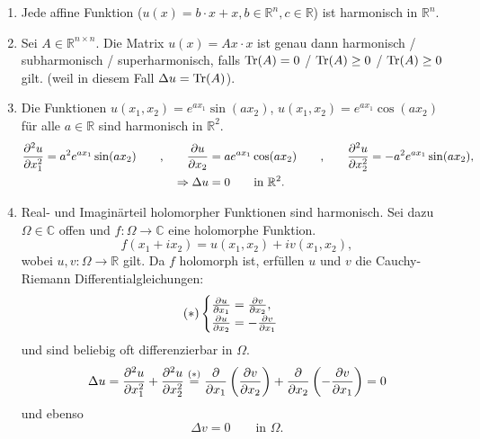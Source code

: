 \begin{beispiele}
	\begin{enumerate}[1.]
		\item Jede affine Funktion ($u(x) = b \cdot x + x, b \in \mathbb{R}^n , c \in \mathbb{R}$) ist harmonisch in $\mathbb{R}^n$.
		\item Sei $A \in \mathbb{R}^{n \times n}$. Die Matrix $u(x) = Ax \cdot x$ ist genau dann harmonisch / subharmonisch / superharmonisch, falls $ \operatorname{Tr}(A)= 0$ / $ \operatorname{Tr}(A) \geq  0 $ / $ \operatorname{Tr}(A) \geq  0 $ gilt. (weil in diesem Fall $\Delta u = \operatorname{Tr}(A)$).
		\item Die Funktionen $u(x_1,x_2)= e^{ax_1}\sin(ax_2)$, $u(x_1,x_2)= e^{ax_1} \cos(ax_2)$ für alle $a \in \mathbb{R}$ sind harmonisch in $\mathbb{R}^2$.
		\begin{align}
			\frac{{\partial ^2u}}{{\partial x_1^2}}  = a^2 e^{ax_1} \sin(ax_2) \qquad \text{,} \qquad \frac{{\partial u}}{{\partial x_2}}  &= a e^{ax_1} \cos(ax_2) 
			\qquad \text{,} \qquad \frac{{\partial ^2u}}{{\partial x_2^2}}  = - a^2 e^{ax_1} \sin(ax_2), \\
			\Rightarrow \Delta u &= 0 \qquad \text{in } \mathbb{R}^2.
		\end{align}
		\item Real- und Imaginärteil holomorpher Funktionen sind harmonisch. Sei dazu $\Omega \in \mathbb{C}$ offen und $f: \Omega \to \mathbb{C}$ eine holomorphe Funktion.
		\begin{equation}
			f ( x_1 + i x_2) = u(x_1,x_2) + i v(x_1,x_2), 
		\end{equation}
		wobei $u,v : \Omega \to  \mathbb{R}$ gilt. Da $f$ holomorph ist, erfüllen $u$ und $v$ die Cauchy-Riemann Differentialgleichungen:
		\begin{align}
			(*)
			\begin{cases}
				\frac{{\partial u}}{{\partial x_1}} = \frac{{\partial v}}{{\partial x_2}} , \\
				\frac{{\partial u}}{{\partial x_2}} = -\frac{{\partial v}}{{\partial x_1}} 	\label{(stern)}
			\end{cases}
		\end{align}
		und sind beliebig oft differenzierbar in $\Omega$.
		\begin{equation}
			\Delta u = \frac{{\partial ^2u}}{{\partial x_1^2}}  + \frac{{\partial ^2u}}{{\partial x_2^2}}  \stackrel{(*)}{=} \frac{{\partial }}{{\partial x_1}}  \left( \frac{{\partial v}}{{\partial x_2}}  \right) + \frac{{\partial }}{{\partial x_2}}  \left( - \frac{{\partial v}}{{\partial x_1}}  \right) = 0
		\end{equation}
		und ebenso
		\[
			\Delta v = 0 \qquad \text{in } \Omega.
		\]
	\end{enumerate}
\end{beispiele}

